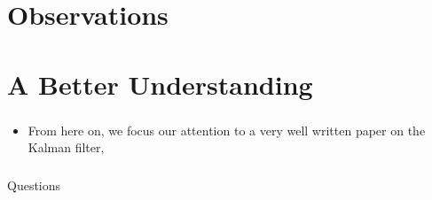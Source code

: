 \section{Observations}
\begin{frame}\pw\Large
\frametitle{}
\framesubtitle{}
\end{frame}



\section{A Better Understanding}
\begin{frame}\pw\Large
\frametitle{}
\framesubtitle{}
\begin{itemize}
\item From here on, we focus our attention to a very well written paper on the Kalman filter,  
\end{itemize}
\end{frame}

\appendix
\begin{frame}\pw\Large
\frametitle{}
\framesubtitle{}
Questions
\end{frame}



